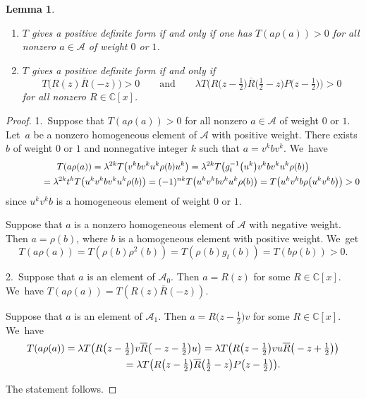 \documentclass[pdftex]{sigma}
\newcommand{\CN}{\mathbb{C}} %
\newcommand{\ovl}{\overline}
\newcommand{\mc}[1]{\mathcal{#1}}
\newtheorem{Lemma}[Theorem]{Lemma}
\theoremstyle{definition}
\numberwithin{equation}{section}
\begin{document}
\begin{Lemma}\label{posde}\qquad
\begin{enumerate}\itemsep=0pt
\item[$1.$]
$T$ gives a positive definite form if and only if one has $T(a\rho(a))>0$ for all nonzero $a\in \mc{A}$ of weight $0$ or $1$.
\item[$2.$]
$T$ gives a positive definite form if and only if
\[T\big(R(z)\ovl{R}(-z)\big)>0\qquad \text{and}\qquad
\lambda T\big(R\big(z-\tfrac{1}{2}\big)\ovl{R}\big(\tfrac{1}{2}-z\big)P\big(z-\tfrac{1}{2}\big)\big)>0
\]
for all nonzero $R\in \CN[x]$.
\end{enumerate}
\end{Lemma}

\begin{proof}
1.\ Suppose that $T(a\rho(a))>0$ for all nonzero $a\in \mc{A}$ of weight $0$ or $1$. Let~$a$ be a nonzero homogeneous element of $\mc{A}$ with positive weight. There exists $b$ of weight $0$ or $1$ and nonnegative integer $k$ such that $a=v^kbv^k$. We~have
\begin{gather*}
T(a\rho(a))=\lambda^{2k}T\big(v^kbv^ku^k\rho(b)u^k\big)=\lambda^{2k}T\big(g_t^{-1}\big(u^k\big)v^kbv^ku^k\rho(b)\big)
\\ \hphantom{T(a\rho(a))}
{}= \lambda^{2k}t^{k}T\big(u^kv^kbv^ku^k\rho(b)\big)=
(-1)^{nk}T\big(u^kv^kbv^ku^k\rho(b)\big)=T\big(u^kv^kb\rho\big(u^kv^kb\big)\big)>0
\end{gather*}
since $u^kv^kb$ is a homogeneous element of weight $0$ or $1$.

Suppose that $a$ is a nonzero homogeneous element of $\mc{A}$ with negative weight. Then $a=\rho(b)$, where $b$ is a homogeneous element with positive weight. We~get
\[
T(a\rho(a))=T(\rho(b)\rho^2(b))=T(\rho(b)g_t(b))=T(b\rho(b))>0.
\]

2.\ Suppose that $a$ is an element of $\mc{A}_0$. Then $a=R(z)$ for some $R\in\CN[x]$. We~have $T(a\rho(a))=T(R(z)\ovl{R}(-z))$.

Suppose that $a$ is an element of $\mc{A}_1$. Then $a=R\big(z-\frac{1}{2}\big)v$ for some $R\in \CN[x]$. We~have
\begin{gather*}
T(a\rho(a))=\lambda T\big(R\big(z-\tfrac{1}{2}\big)v \ovl{R}\big(-z-\tfrac{1}{2}\big)u\big)
= \lambda T\big(R\big(z-\tfrac{1}{2}\big)vu \ovl{R}\big(-z+\tfrac{1}{2}\big)\big)
\\ \hphantom{T(a\rho(a))}
{}=
\lambda T\big(R\big(z-\tfrac{1}{2}\big)\ovl{R}\big(\tfrac{1}{2}-z\big)P\big(z-\tfrac{1}{2}\big)\big).
\end{gather*}

The statement follows.
\end{proof}
\end{document}
